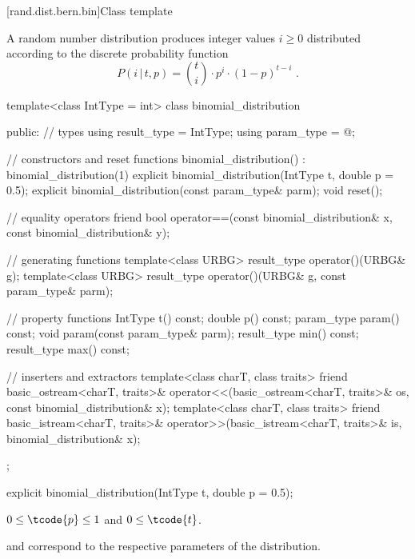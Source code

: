 
[rand.dist.bern.bin]{Class template }%
%

\pnum
A  random number distribution
produces integer values $i \geq 0$
distributed according to
the discrete probability function%
\[ P(i\,|\,t,p) = \binom{t}{i} \cdot p^i \cdot (1-p)^{t-i} \text{ .} \]

%
%
\begin{codeblock}
template<class IntType = int>
  class binomial_distribution {
  public:
    // types
    using result_type = IntType;
    using param_type  = @\unspec@;

    // constructors and reset functions
    binomial_distribution() : binomial_distribution(1) {}
    explicit binomial_distribution(IntType t, double p = 0.5);
    explicit binomial_distribution(const param_type& parm);
    void reset();

    // equality operators
    friend bool operator==(const binomial_distribution& x, const binomial_distribution& y);

    // generating functions
    template<class URBG>
      result_type operator()(URBG& g);
    template<class URBG>
      result_type operator()(URBG& g, const param_type& parm);

    // property functions
    IntType t() const;
    double p() const;
    param_type param() const;
    void param(const param_type& parm);
    result_type min() const;
    result_type max() const;

    // inserters and extractors
    template<class charT, class traits>
      friend basic_ostream<charT, traits>&
        operator<<(basic_ostream<charT, traits>& os, const binomial_distribution& x);
    template<class charT, class traits>
      friend basic_istream<charT, traits>&
        operator>>(basic_istream<charT, traits>& is, binomial_distribution& x);
  };
\end{codeblock}


%
\begin{itemdecl}
explicit binomial_distribution(IntType t, double p = 0.5);
\end{itemdecl}

\begin{itemdescr}
\pnum
\expects
$0 \leq \tcode{p} \leq 1$ and $0 \leq \tcode{t} $.

\pnum
\remarks
  and 
 correspond to the respective parameters of the distribution.
\end{itemdescr}

